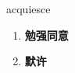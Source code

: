 
\begin{frame}
{\huge acquiesce}
\begin{center}
\begin{enumerate}\Large
  \item \textbf{勉强同意}
  \item \textbf{默许}
\end{enumerate}
\end{center}
\end{frame}
